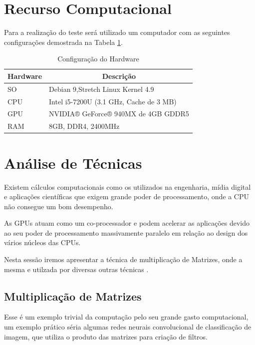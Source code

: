 \documentclass[conference]{IEEEtran}
\begin{document}
	\section{Recurso Computacional}
	Para a realiza\c{c}\~ao do teste ser\'a utilizado um computador com as seguintes configura\c{c}\~oes demostrada na Tabela \ref{pc:pc1}.
	
	\begin{table}[H]
		\centering
		\caption{Configuração do Hardware}
		\label{pc:pc1}
		\begin{tabular}{ll}
			\hline
			
			\textbf{Hardware} & \multicolumn{1}{c}{\textbf{Descrição}}  \\ \hline
			SO                & Debian 9,Stretch Linux Kernel 4.9       \\
			CPU               & Intel i5-7200U (3.1 GHz, Cache de 3 MB) \\
			GPU               & NVIDIA® GeForce® 940MX de 4GB GDDR5     \\
			RAM               & 8GB, DDR4, 2400MHz                      \\ \hline
		\end{tabular}
	\end{table}
	
	\section{An\'alise de T\'ecnicas}
	
	Existem c\'alculos computacionais como os utilizados na engenharia, m\'idia digital e aplica\c{c}\~oes cient\'ificas que exigem grande poder de processamento, onde a CPU n\~ao consegue um bom desempenho. 
	
	As GPUs atuam como um co-processador e podem acelerar as aplica\c{c}\~oes devido ao seu poder de processamento massivamente paralelo em rela\c{c}\~ao ao design dos v\'arios n\'ucleos das CPUs.
	
	Nesta sess\~ao iremos apresentar a técnica de multiplicação de Matrizes, onde a mesma e utilzada por diversas outras técnicas \cite{IEEEhowto:3}.
	
	
	\subsection{Multiplica\c{c}\~ao de Matrizes}
	
	Esse \'e um exemplo trivial da computa\c{c}\~ao pelo seu grande gasto computacional, um exemplo pr\'atico s\'eria algumas redes neurais convolucional de classifica\c{c}\~ao de imagem, que utiliza o produto das matrizes para cria\c{c}\~ao de filtros.
	
\end{document}
